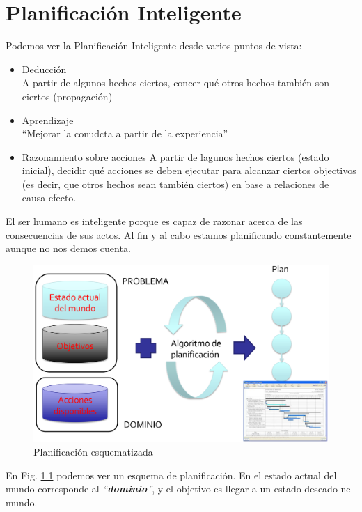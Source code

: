 \chapter{Planificación Inteligente}

Podemos ver la Planificación Inteligente desde varios puntos de vista:
\begin{itemize}
   \item Deducción\\
   A partir de algunos hechos ciertos, concer qué otros hechos también son ciertos (propagación)
   \item Aprendizaje\\
   ``Mejorar la conudcta a partir de la experiencia''
   \item Razonamiento sobre acciones
   A partir de lagunos hechos ciertos (estado inicial), decidir qué acciones se deben ejecutar para alcanzar ciertos objectivos (es decir, que otros hechos sean también ciertos) en base a relaciones de causa-efecto. 
\end{itemize}

El ser humano es inteligente porque es capaz de razonar acerca de las consecuencias de sus actos. Al fin y al cabo estamos planificando constantemente aunque no nos demos cuenta.

\begin{figure}[htbp]
   \centering
   \includegraphics{images/02/planificacion.png}
   \caption{Planificación esquematizada}
   \label{fig:02/planificacion}
\end{figure}

En Fig. \ref{fig:02/planificacion} podemos ver un esquema de planificación. En el estado actual del mundo corresponde al \textit{``\textbf{dominio}''}, y el objetivo es llegar a un estado deseado nel mundo.

